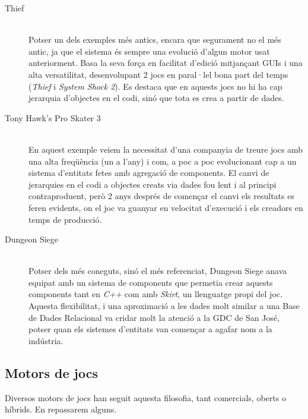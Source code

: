 \begin{description}
  \item[Thief] \citep{Leonard99} \hfill \\
    Potser un dels exemples més antics, encara que segurament no el més antic, ja que el sistema és sempre una evolució d'algun motor usat anteriorment. Basa la seva força en facilitat d'edició mitjançant GUIs i una alta versatilitat, desenvolupant 2 jocs en paral·lel bona part del temps ({\em Thief} i {\em System Shock 2}). Es destaca que en aquests jocs no hi ha cap jerarquia d'objectes en el codi, sinó que tota es crea a partir de dades.
    
  \item[Tony Hawk's Pro Skater 3] \citep{West07} \hfill \\
    En aquest exemple veiem la necessitat d'una companyia de treure jocs amb una alta freqüència (un a l'any) i com, a poc a poc evolucionant cap a un sistema d'entitats fetes amb agregació de components. El canvi de jerarquies en el codi a objectes creats via dades fou lent i al principi contraproduent, però 2 anys després de començar el canvi els resultats es feren evidents, on el joc va guanyar en velocitat d'execució i els creadors en temps de producció.
    
  \item[Dungeon Siege] \citep{Bilas02} \hfill \\
    Potser dels més coneguts, sinó el més referenciat, Dungeon Siege anava equipat amb un sistema de components que permetia crear aquests components tant en {\em C++} com amb {\em Skirt}, un llenguatge propi del joc. Aquesta flexibilitat, i una aproximació a les dades molt similar a una Base de Dades Relacional va cridar molt la atenció a la GDC de San José, potser quan els sistemes d'entitats van començar a agafar nom a la indústria.
    
\end{description}


\subsection{Motors de jocs}

Diversos motors de jocs han seguit aquesta filosofia, tant comercials, oberts o híbrids. En repassarem alguns.

